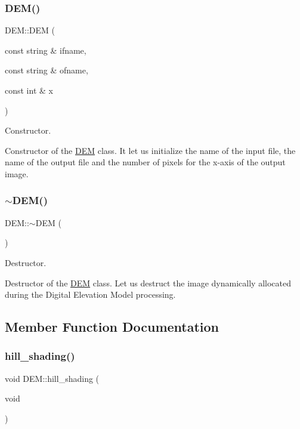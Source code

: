 \subsubsection{\texorpdfstring{D\+E\+M()}{DEM()}}
{\footnotesize\ttfamily D\+E\+M\+::\+D\+EM (\begin{DoxyParamCaption}\item[{const string \&}]{ifname,  }\item[{const string \&}]{ofname,  }\item[{const int \&}]{x }\end{DoxyParamCaption})}



Constructor. 

Constructor of the \hyperlink{classDEM}{D\+EM} class. It let us initialize the name of the input file, the name of the output file and the number of pixels for the x-\/axis of the output image. \mbox{\label{classDEM_abd0e17d348572bcb75f94a23652828fc}} 
\subsubsection{\texorpdfstring{$\sim$\+D\+E\+M()}{~DEM()}}
{\footnotesize\ttfamily D\+E\+M\+::$\sim$\+D\+EM (\begin{DoxyParamCaption}{ }\end{DoxyParamCaption})}



Destructor. 

Destructor of the \hyperlink{classDEM}{D\+EM} class. Let us destruct the image dynamically allocated during the Digital Elevation Model processing. 

\subsection{Member Function Documentation}
\mbox{\label{classDEM_ae5972d803d7f32e640fb732d4a98dfcf}} 
\subsubsection{\texorpdfstring{hill\+\_\+shading()}{hill\_shading()}}
{\footnotesize\ttfamily void D\+E\+M\+::hill\+\_\+shading (\begin{DoxyParamCaption}\item[{void}]{ }\end{DoxyParamCaption})}



